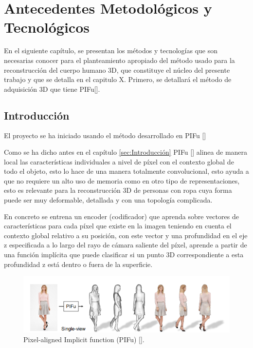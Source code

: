 
\chapter{Antecedentes Metodológicos y Tecnológicos}
\label{Antecedentes Metodológicos y Tecnológicos}
En el siguiente capítulo, se presentan los métodos y tecnologías que son necesarias
conocer para el planteamiento apropiado del método usado para la reconstrucción del cuerpo humano 3D, que constituye el núcleo del presente trabajo y que se detalla en el capitulo X.
Primero, se detallará el método de adquisición 3D que tiene PIFu[\cite{pifu}]. 
\section{Introducción}

El proyecto se ha iniciado usando el método desarrollado en PIFu [\cite{pifu}] 

Como se ha dicho antes en el capítulo \ref{sec:Introducción} PIFu [\cite{pifu}] alinea de manera local las características individuales a nivel de píxel con el contexto global de todo el objeto, esto lo hace de una manera totalmente convolucional, esto ayuda a que no requiere un alto uso de memoria como en otro tipo de representaciones, esto es relevante para la reconstrucción 3D de personas con ropa cuya forma puede ser muy deformable, detallada y con una topología complicada.

En concreto se entrena un encoder (codificador) que aprenda sobre vectores de características para cada píxel que existe en la imagen teniendo en cuenta el contexto global relativo a su posición, con este vector y una profundidad en el eje z especificada a lo largo del rayo de cámara saliente del píxel, aprende a partir de una función implícita que puede clasificar si un punto 3D correspondiente a esta profundidad z está dentro o fuera de la superficie.

\begin{figure}[H]
	\centering
	\includegraphics[scale=0.7]{imagenes/antecedentes1.png}
	\caption{Pixel-aligned Implicit function (PIFu) [\cite{pifu}].}
	\label{fig:figura7}
\end{figure}

